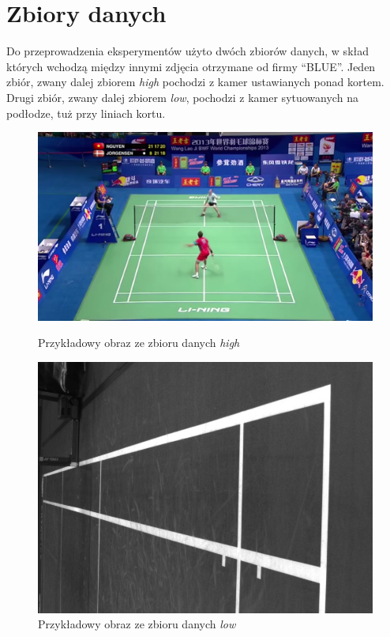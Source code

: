 \newpage

\newpage
\section{Zbiory danych}

Do przeprowadzenia eksperymentów użyto dwóch zbiorów danych, w skład których wchodzą między innymi zdjęcia otrzymane od firmy ``BLUE''.
Jeden zbiór, zwany dalej zbiorem \textit{high} pochodzi z kamer ustawianych ponad kortem.
Drugi zbiór, zwany dalej zbiorem \textit{low}, pochodzi z kamer sytuowanych na podłodze, tuż przy liniach kortu.


\begin{figure}[!htb]
    \includegraphics[width=\linewidth]{../../badminton/datasets/high/split/test_court2-00002.png}
    \caption{Przykładowy obraz ze zbioru danych \textit{high}}
  \endminipage\hfill
    \includegraphics[width=\linewidth]{../../badminton/datasets/low/split/1564909032792410075.jpg}
    \caption{Przykładowy obraz ze zbioru danych \textit{low}}
  \endminipage\hfill
\end{figure}

